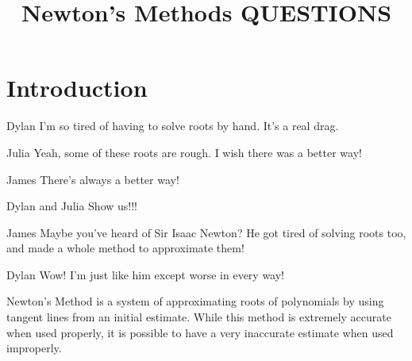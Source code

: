 \documentclass{ximera}
\title{Newton's Methods QUESTIONS}
\begin{document}
\maketitle
\section{Introduction}
\begin{dialogue}
\item[Dylan] I'm so tired of having to solve roots by hand. It's a real drag.
\item[Julia] Yeah, some of these roots are rough. I wish there was a better way!
\item[James] There's always a better way!
\item[Dylan and Julia] Show us!!!
\item[James] Maybe you've heard of Sir Isaac Newton? He got tired of solving roots too, and made a whole method to approximate them!
\item[Dylan] Wow! I'm just like him except worse in every way!
\end{dialogue}
Newton's Method is a system of approximating roots of polynomials by using tangent lines from an initial estimate. While this method is extremely accurate when used properly, it is possible to have a very inaccurate estimate when used improperly.
\end{document}
